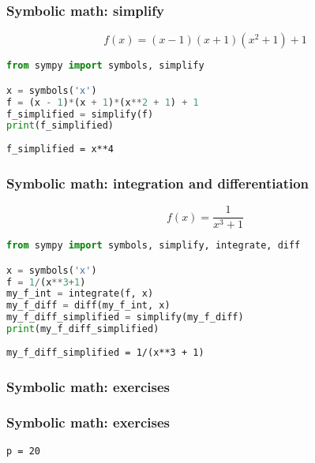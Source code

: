 
\begin{frame}[fragile]
  \frametitle{Symbolic math: simplify}
  \[ f(x) = (x - 1) (x + 1) (x^2 + 1) + 1 \]
  \pause
  \begin{lstlisting}[language=Python]
from sympy import symbols, simplify

x = symbols('x')
f = (x - 1)*(x + 1)*(x**2 + 1) + 1
f_simplified = simplify(f)
print(f_simplified)
  \end{lstlisting}
  \pause
  \texttt{f\_simplified = x**4}
\end{frame}

\begin{frame}[fragile]
  \frametitle{Symbolic math: integration and differentiation}
  \[ f(x) = \frac{1}{x^3+1} \]
  \pause
  \begin{lstlisting}[language=Python]
from sympy import symbols, simplify, integrate, diff

x = symbols('x')
f = 1/(x**3+1)
my_f_int = integrate(f, x)
my_f_diff = diff(my_f_int, x)
my_f_diff_simplified = simplify(my_f_diff)
print(my_f_diff_simplified)
\end{lstlisting}
  \pause
  \texttt{my\_f\_diff\_simplified = 1/(x**3 + 1)}
\end{frame}

\begin{frame}[fragile]
  \frametitle{Symbolic math: exercises}
\end{frame}

\begin{frame}[fragile]
  \frametitle{Symbolic math: exercises}
  \pause
  \texttt{p = 20}
\end{frame}

